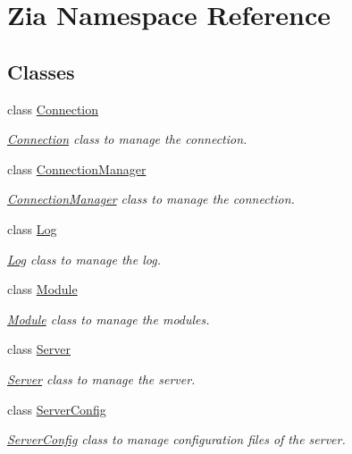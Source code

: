 \hypertarget{namespace_zia}{}\section{Zia Namespace Reference}
\label{namespace_zia}
\subsection*{Classes}
\begin{DoxyCompactItemize}
\item 
class \hyperlink{class_zia_1_1_connection}{Connection}
\begin{DoxyCompactList}\small\item\em \hyperlink{class_zia_1_1_connection}{Connection} class to manage the connection. \end{DoxyCompactList}\item 
class \hyperlink{class_zia_1_1_connection_manager}{Connection\+Manager}
\begin{DoxyCompactList}\small\item\em \hyperlink{class_zia_1_1_connection_manager}{Connection\+Manager} class to manage the connection. \end{DoxyCompactList}\item 
class \hyperlink{class_zia_1_1_log}{Log}
\begin{DoxyCompactList}\small\item\em \hyperlink{class_zia_1_1_log}{Log} class to manage the log. \end{DoxyCompactList}\item 
class \hyperlink{class_zia_1_1_module}{Module}
\begin{DoxyCompactList}\small\item\em \hyperlink{class_zia_1_1_module}{Module} class to manage the modules. \end{DoxyCompactList}\item 
class \hyperlink{class_zia_1_1_server}{Server}
\begin{DoxyCompactList}\small\item\em \hyperlink{class_zia_1_1_server}{Server} class to manage the server. \end{DoxyCompactList}\item 
class \hyperlink{class_zia_1_1_server_config}{Server\+Config}
\begin{DoxyCompactList}\small\item\em \hyperlink{class_zia_1_1_server_config}{Server\+Config} class to manage configuration files of the server. \end{DoxyCompactList}\end{DoxyCompactItemize}
